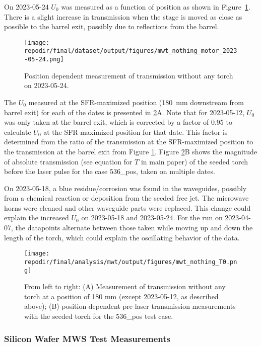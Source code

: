 On 2023-05-24 $U_{0}$ was measured as a function of position as shown in Figure\ \ref{fig:SI_MWT_nothing_motor}. There is a slight increase in transmission when the stage is moved as close as possible to the barrel exit, possibly due to reflections from the barrel.


\begin{figure}
\centering
\texttt{[image: \\repodir/final/dataset/output/figures/mwt\_nothing\_motor\_2023-05-24.png]}
\caption{Position dependent measurement of transmission without any torch on 2023-05-24. }
\label{fig:SI_MWT_nothing_motor}
\end{figure}


The $U_{0}$ measured at the SFR-maximized position (\SI{180} {\milli\meter} downstream from barrel exit) for each of the dates is presented in \ref{fig:SI_MWT_nothing_T0}A. Note that for 2023-05-12, $U_{0}$ was only taken at the barrel exit, which is corrected by a factor of 0.95 to calculate $U_{0}$ at the SFR-maximized position for that date. This factor is determined from the ratio of the transmission at the SFR-maximized position to the transmission at the barrel exit from Figure \ref{fig:SI_MWT_nothing_motor}. Figure \ref{fig:SI_MWT_nothing_T0}B shows the magnitude of absolute transmission (see equation for $T$ in main paper) of the seeded torch before the laser pulse for the case 536\_pos, taken on multiple dates. 

On 2023-05-18, a blue residue/corrosion was found in the waveguides, possibly from a chemical reaction or deposition from the seeded free jet. The microwave horns were cleaned and other waveguide parts were replaced. This change could explain the increased $U_{0}$ on 2023-05-18 and 2023-05-24. For the run on 2023-04-07, the datapoints alternate between those taken while moving up and down the length of the torch, which could explain the oscillating behavior of the data.



\begin{figure}[]
\centering
\texttt{[image: \\repodir/final/analysis/mwt/output/figures/mwt\_nothing\_T0.png]}
\caption{ From left to right: (A) Measurement of transmission without any torch at a position of 180 mm (except 2023-05-12, as described above); (B) position-dependent pre-laser transmission measurements with the seeded torch for the 536\_pos test case.}
\label{fig:SI_MWT_nothing_T0}
\end{figure}

\subsubsection{Silicon Wafer MWS Test Measurements}

